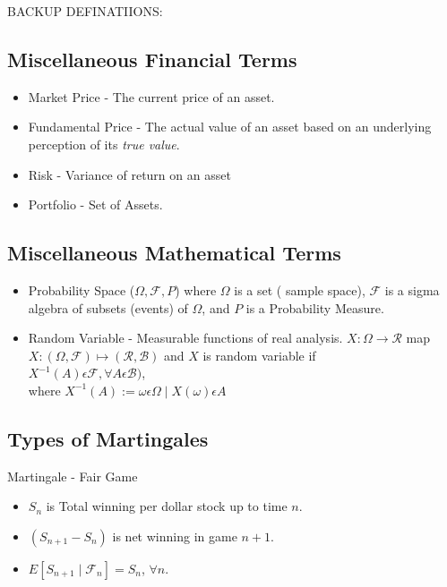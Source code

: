    BACKUP DEFINATIIONS:\\

\subsection {Miscellaneous Financial Terms}
\begin{itemize}
\item Market Price - The current price of an asset.
\item Fundamental Price - The actual value of an asset based on an underlying perception of its \textit{true value}.
\item Risk - Variance of return on an asset 
\item Portfolio - Set of Assets.
\end{itemize} 

\subsection{Miscellaneous Mathematical Terms}
\begin{itemize}
\item Probability Space ($\Omega,\mathcal{F},P$) where $\Omega$ is a set ( sample space), $\mathcal{F}$ is a sigma
algebra of subsets (events) of $\Omega$, and $P$ is a Probability Measure.
\item Random Variable - Measurable functions of real analysis.
$X:\Omega\rightarrow \mathcal{R}$ map $X : (\Omega,\mathcal{F})\mapsto (\mathcal{R}, \mathcal{B})$ and $X$ is random variable if \\
$X^{-1}(A) \epsilon \mathcal{F}, \forall A \epsilon\mathcal{B})$,\\
where $X^{-1}(A):={\omega \epsilon \Omega\mid X(\omega) \epsilon A}$
\end{itemize} 

\subsection{Types of Martingales}
Martingale - Fair Game\\
\begin{itemize}
\item $S_{n}$ is Total winning per dollar stock up to time $n$.
\item $\left( S_{n+1} - S_{n}\right) $ is net winning in game $n+1$.
\item $E[ S_{n+1}\mid \mathcal{F}_{n}] = S_{n}$, $\forall n$.
\end{itemize}

